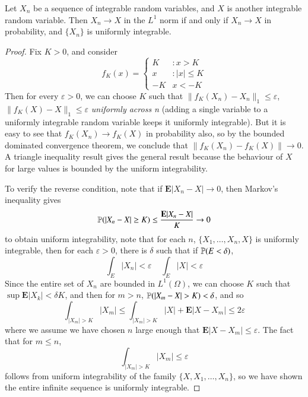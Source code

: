\begin{theorem}
    Let $X_n$ be a sequence of integrable random variables, and $X$ is another integrable random variable. Then $X_n \to X$ in the $L^1$ norm if and only if $X_n \to X$ in probability, and $\{ X_n \}$ is uniformly integrable.
\end{theorem}
\begin{proof}
    Fix $K > 0$, and consider
    \[ f_K(x) = \begin{cases} K &: x > K \\ x & :|x| \leq K\\ -K & x < -K \end{cases} \]
    Then for every $\varepsilon > 0$, we can choose $K$ such that $\| f_K(X_n) - X_n \|_1 \leq \varepsilon$, $\| f_K(X) - X \|_1 \leq \varepsilon$ \emph{uniformly across n} (adding a single variable to a uniformly integrable random variable keeps it uniformly integrable). But it is easy to see that $f_K(X_n) \to f_K(X)$ in probability also, so by the bounded dominated convergence theorem, we conclude that $\| f_K(X_n) - f_K(X) \| \to 0$. A triangle inequality result gives the general result because the behaviour of $X$ for large values is bounded by the uniform integrability.

    To verify the reverse condition, note that if $\mathbf{E}|X_n - X| \to 0$, then Markov's inequality gives
    \[ \operatorname{\mathbb{P}}(|X_n - X| \geq K) \leq \frac{\mathbf{E}|X_n - X|}{K} \to 0 \]
    to obtain uniform integrability, note that for each $n$, $\{ X_1, \dots, X_n, X \}$ is uniformly integrable, then for each $\varepsilon > 0$, there is $\delta$ such that if $\operatorname{\mathbb{P}}(E < \delta)$,
    \[ \int_E |X_n| < \varepsilon\ \ \ \ \ \int_E |X| < \varepsilon \]
    Since the entire set of $X_n$ are bounded in $L^1(\Omega)$, we can choose $K$ such that $\sup \mathbf{E} |X_k| < \delta K$, and then for $m > n$, $\operatorname{\mathbb{P}}(|X_m - X| > K) < \delta$, and so
    \[ \int_{|X_m| > K} |X_m| \leq \int_{|X_m| > K} |X| + \mathbf{E}|X - X_m| \leq 2\varepsilon \]
    where we assume we have chosen $n$ large enough that $\mathbf{E}|X - X_m| \leq \varepsilon$. The fact that for $m \leq n$,
    \[ \int_{|X_m| > K} |X_m| \leq \varepsilon \]
    follows from uniform integrability of the family $\{ X, X_1, \dots, X_n \}$, so we have shown the entire infinite sequence is uniformly integrable.
\end{proof}














